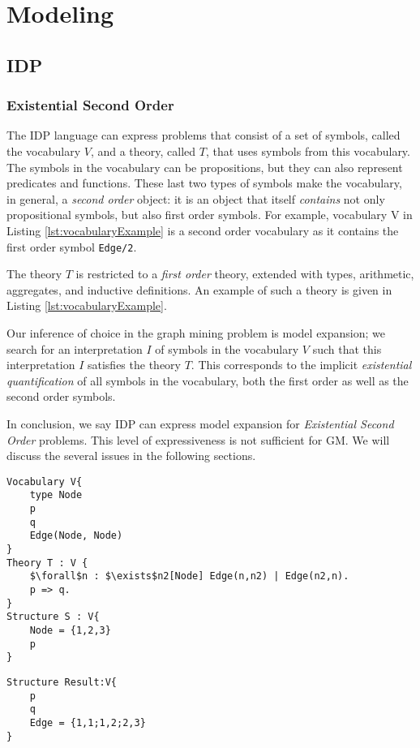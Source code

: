 \section{Modeling}
\subsection{IDP}
\subsubsection{Existential Second Order}
The IDP language can express problems that consist of a set of symbols, called the vocabulary $V$, and a theory, called $T$, that uses symbols from this vocabulary.
The symbols in the vocabulary can be propositions, but they can also represent predicates and functions.
These last two types of symbols make the vocabulary, in general, a \emph{second order} object: it is an object that itself \emph{contains} not only propositional symbols, but also first order symbols.
For example, vocabulary V in Listing \ref{lst:vocabularyExample} is a second order vocabulary as it contains the first order symbol \lstinline{Edge/2}.

The theory $T$ is restricted to a \emph{first order} theory, extended with types, arithmetic, aggregates, and inductive definitions.
An example of such a theory is given in Listing \ref{lst:vocabularyExample}.

Our inference of choice in the graph mining problem is model expansion; we search for an interpretation $I$ of symbols in the vocabulary $V$ such that this interpretation $I$ satisfies the theory $T$.
This corresponds to the implicit \emph{existential quantification} of all symbols in the vocabulary, both the first order as well as the second order symbols.

In conclusion, we say IDP can express model expansion for \emph{Existential Second Order} problems.
This level of expressiveness is not sufficient for GM.
We will discuss the several issues in the following sections.

\begin{lstlisting}[mathescape,basicstyle=\fontfamily{lmvtt}\selectfont,caption=\ldots, label=lst:vocabularyExample]
Vocabulary V{
    type Node
    p
    q
    Edge(Node, Node)
}
Theory T : V {
    $\forall$n : $\exists$n2[Node] Edge(n,n2) | Edge(n2,n).
    p => q.
}
Structure S : V{
    Node = {1,2,3}
    p
}
\end{lstlisting}
\begin{lstlisting}
Structure Result:V{
    p
    q
    Edge = {1,1;1,2;2,3}
}
\end{lstlisting}


